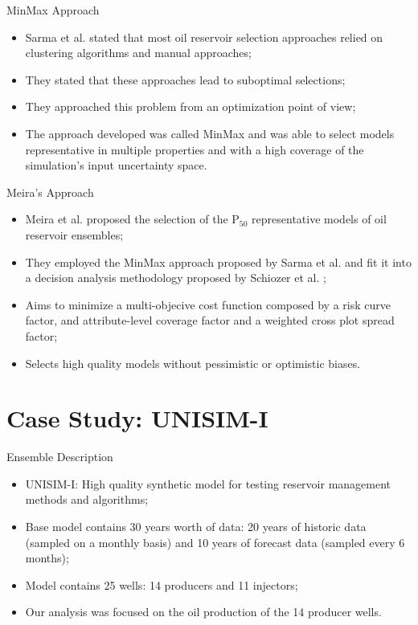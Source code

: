 \documentclass{beamer}
\begin{document}
\begin{frame}{MinMax Approach}
  \begin{itemize}
    \item Sarma et al.  stated that most oil reservoir selection approaches relied on clustering algorithms and manual approaches;
    \item They stated that these approaches lead to suboptimal selections;
    \item They approached this problem from an optimization point of view;
    \item The approach developed was called MinMax and was able to select models representative in multiple properties and with a high coverage of the simulation's input uncertainty space.
  \end{itemize}
\end{frame}

\begin{frame}{Meira's Approach}
  \begin{itemize}
    \item Meira et al.  proposed the selection of the P$_{50}$ representative models of oil reservoir ensembles;
    \item They employed the MinMax approach proposed by Sarma et al. and fit it into a decision analysis methodology proposed by Schiozer et al. ;
    \item Aims to minimize a multi-objecive cost function composed by a risk curve factor, and attribute-level coverage factor and a weighted cross plot spread factor;
    \item Selects high quality models without pessimistic or optimistic biases.
  \end{itemize}
\end{frame}

\section{Case Study: UNISIM-I}
\begin{frame}
  \tableofcontents[currentsection]
\end{frame}

\begin{frame}{Ensemble Description}
  \begin{itemize}
    \item UNISIM-I: High quality synthetic model for testing reservoir management methods and algorithms;
    \item Base model contains 30 years worth of data: 20 years of historic data (sampled on a monthly basis) and 10 years of forecast data (sampled every 6 months);
    \item Model contains 25 wells: 14 producers and 11 injectors;
    \item Our analysis was focused on the oil production of the 14 producer wells.
  \end{itemize}
\end{frame}
\end{document}

